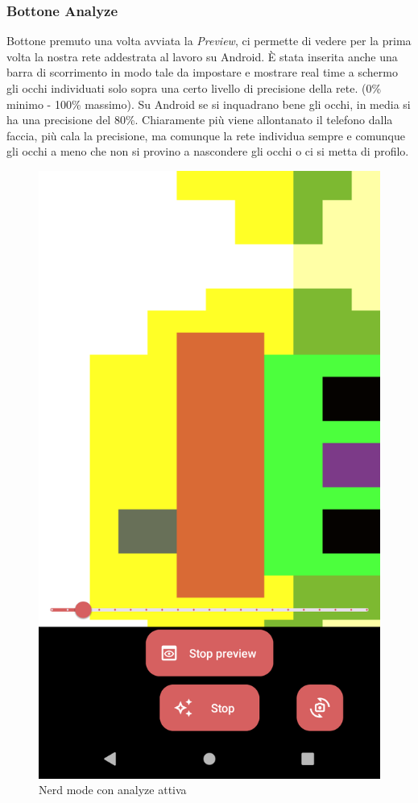 \documentclass[11pt]{article}
\begin{document}
\newpage
\subsubsection{Bottone Analyze}
Bottone premuto una volta avviata la \textit{Preview}, ci permette di vedere per la prima volta la nostra rete addestrata al lavoro su Android.
È stata inserita anche una barra di scorrimento in modo tale da impostare e mostrare real time a schermo gli occhi individuati solo sopra una certo livello di precisione della rete. (0\% minimo - 100\% massimo). Su Android se si inquadrano bene gli occhi, in media si ha una precisione del 80\%. 
\newline
Chiaramente più viene allontanato il telefono dalla faccia, più cala la precisione, ma comunque la rete individua sempre e comunque gli occhi a meno che non si provino a nascondere gli occhi o ci si metta di profilo.

\begin{figure}[h]
\caption{Nerd mode con analyze attiva }
\centering
\includegraphics[scale=0.17]{img/analyze.png}
\end{figure}
\end{document}
